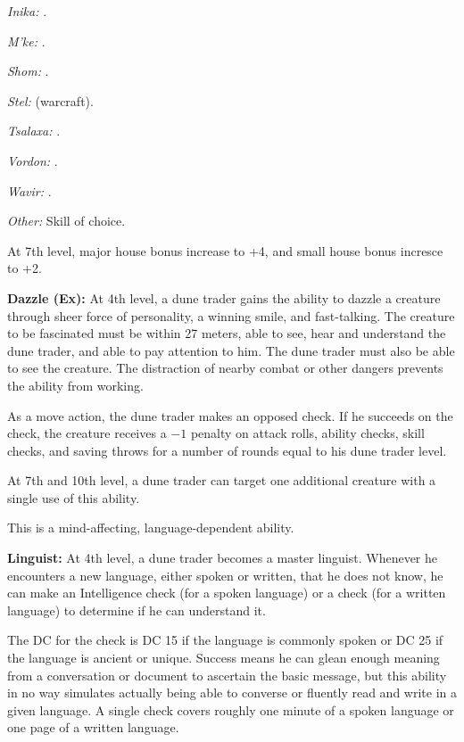 {\textit{Inika:} .

\textit{M'ke:} .

\textit{Shom:} .

\textit{Stel:}  (warcraft).

\textit{Tsalaxa:} .

\textit{Vordon:} .

\textit{Wavir:} .

\textit{Other:} Skill of choice.

At 7th level, major house bonus increase to +4, and small house bonus incresce to +2.

\textbf{Dazzle (Ex):} At 4th level, a dune trader gains the ability to dazzle a creature through sheer force of personality, a winning smile, and fast-talking. The creature to be fascinated must be within 27 meters, able to see, hear and understand the dune trader, and able to pay attention to him. The dune trader must also be able to see the creature. The distraction of nearby combat or other dangers prevents the ability from working.

As a move action, the dune trader makes an opposed  check. If he succeeds on the check, the creature receives a $-1$ penalty on attack rolls, ability checks, skill checks, and saving throws for a number of rounds equal to his dune trader level.

At 7th and 10th level, a dune trader can target one additional creature with a single use of this ability.

This is a mind-affecting, language-dependent ability.

\textbf{Linguist:} At 4th level, a dune trader becomes a master linguist. Whenever he encounters a new language, either spoken or written, that he does not know, he can make an Intelligence check (for a spoken language) or a  check (for a written language) to determine if he can understand it.

The DC for the check is DC 15 if the language is commonly spoken or DC 25 if the language is ancient or unique. Success means he can glean enough meaning from a conversation or document to ascertain the basic message, but this ability in no way simulates actually being able to converse or fluently read and write in a given language. A single check covers roughly one minute of a spoken language or one page of a written language.

}
